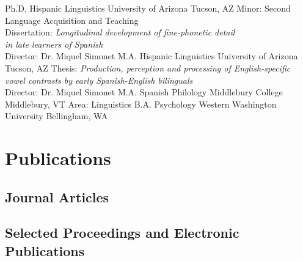\documentclass[11pt,letterpaper]{moderncv}
\begin{document}
        {Ph.D, Hispanic Linguistics}
        {}
        {University of Arizona}
        {Tucson, AZ}
        {Minor: Second Language Acquisition and Teaching \\
        Dissertation: \emph{Longitudinal development of fine-phonetic detail \\in late learners of Spanish} \\ Director: Dr. Miquel Simonet}
        {M.A.}
        {Hispanic Linguistics}
        {University of Arizona}
        {Tucson, AZ}
        {Thesis: \emph{Production, perception and processing of English-specific \\vowel contrasts by early Spanish-English bilinguals} \\ Director: Dr. Miquel Simonet}
        {M.A.}
        {Spanish Philology}
        {Middlebury College}
        {Middlebury, VT}
        {Area: Linguistics}
        {B.A.}
        {Psychology}
        {Western Washington University}
        {Bellingham, WA}
        {}









\section{Publications}

\nobibliography*
\newcommand{}

\subsection{Journal Articles}

\subsection{Selected Proceedings and Electronic Publications}
\end{document}
